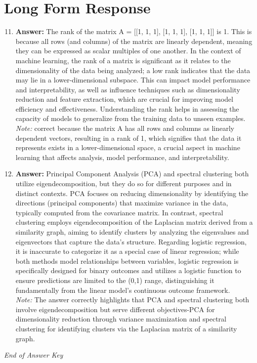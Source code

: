 \documentclass[12pt]{article}
\begin{document}
\section*{Long Form Response}
\begin{enumerate}[label=\arabic*.]
\setcounter{enumi}{10}
\item \textbf{Answer:} The rank of the matrix A = [[1, 1, 1], [1, 1, 1], [1, 1, 1]] is 1. This is because all rows (and columns) of the matrix are linearly dependent, meaning they can be expressed as scalar multiples of one another. In the context of machine learning, the rank of a matrix is significant as it relates to the dimensionality of the data being analyzed; a low rank indicates that the data may lie in a lower-dimensional subspace. This can impact model performance and interpretability, as well as influence techniques such as dimensionality reduction and feature extraction, which are crucial for improving model efficiency and effectiveness. Understanding the rank helps in assessing the capacity of models to generalize from the training data to unseen examples.
\\ \textit{Note:} correct because the matrix A has all rows and columns as linearly dependent vectors, resulting in a rank of 1, which signifies that the data it represents exists in a lower-dimensional space, a crucial aspect in machine learning that affects analysis, model performance, and interpretability.
\item \textbf{Answer:} Principal Component Analysis (PCA) and spectral clustering both utilize eigendecomposition, but they do so for different purposes and in distinct contexts. PCA focuses on reducing dimensionality by identifying the directions (principal components) that maximize variance in the data, typically computed from the covariance matrix. In contrast, spectral clustering employs eigendecomposition of the Laplacian matrix derived from a similarity graph, aiming to identify clusters by analyzing the eigenvalues and eigenvectors that capture the data's structure. Regarding logistic regression, it is inaccurate to categorize it as a special case of linear regression; while both methods model relationships between variables, logistic regression is specifically designed for binary outcomes and utilizes a logistic function to ensure predictions are limited to the (0,1) range, distinguishing it fundamentally from the linear model's continuous outcome framework.
\\ \textit{Note:} The answer correctly highlights that PCA and spectral clustering both involve eigendecomposition but serve different objectives-PCA for dimensionality reduction through variance maximization and spectral clustering for identifying clusters via the Laplacian matrix of a similarity graph.
\end{enumerate}

\vfill
\noindent\textit{End of Answer Key}
\end{document}
